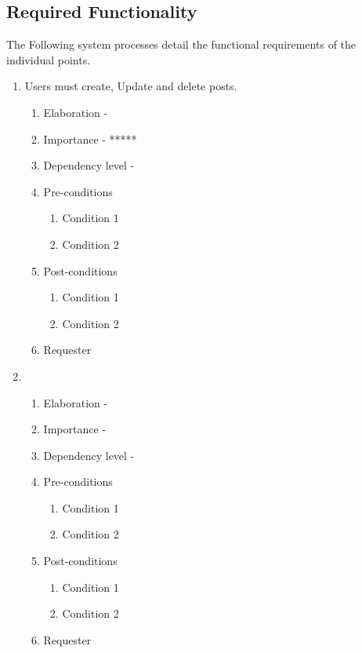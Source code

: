 \documentclass[12pt]{article}
\begin{document}
\subsection{Required Functionality}
The Following system processes detail the functional requirements of the individual points.
\begin{enumerate}
  \item Users must create, Update and delete posts. %
  \begin{enumerate}
    \item Elaboration - 
    \item Importance - *****
    \item Dependency level - 
    \item Pre-conditions
    \begin{enumerate}
    	\item Condition 1
    	\item Condition 2
    \end{enumerate}
        \item Post-conditions
    \begin{enumerate}
    	\item Condition 1
    	\item Condition 2
    \end{enumerate}
    \item Requester
  \end{enumerate}
\newpage %
  \item  %
  \begin{enumerate}
    \item Elaboration - 
    \item Importance - 
    \item Dependency level - 
    \item Pre-conditions
    \begin{enumerate}
    	\item Condition 1
    	\item Condition 2
    \end{enumerate}
        \item Post-conditions
    \begin{enumerate}
    	\item Condition 1
    	\item Condition 2
    \end{enumerate}
    \item Requester
  \end{enumerate}

\end{enumerate}
\end{document}
